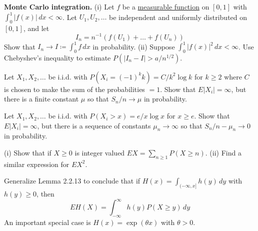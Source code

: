   \begin{exercise}[Durrett 2.2.3]
    \textbf{Monte Carlo integration.} (i) Let $f$ be a \hyperref[mt-def:measurable-function]{measurable function} on $[0, 1]$ with $\int_0^1 |f(x)| \, dx < \infty$. Let $U_1, U_2, \dots$ be independent and uniformly distributed on $[0, 1]$, and let
    \begin{equation*}
      I_n = n^{-1}(f(U_1) + \dots + f(U_n))
    \end{equation*}
    Show that $I_n \to I \coloneqq \int_0^1 f \, dx$ in probability. (ii) Suppose $\int_0^1 |f(x)|^2 \, dx < \infty$. Use Chebyshev's inequality to estimate $P(|I_n - I| > a/n^{1/2})$.
  \end{exercise}
  \begin{solution}

  \end{solution}

  \begin{exercise}[Durrett 2.2.4]
    Let $X_1, X_2, \dots$ be i.i.d. with $P(X_i = (-1)^k k) = C/k^2 \log k$ for $k \geq 2$ where $C$ is chosen to make the sum of the probabilities $= 1$. Show that $E|X_i| = \infty$, but there is a finite constant $\mu$ so that $S_n/n \to \mu$ in probability.
  \end{exercise}
  \begin{solution}

  \end{solution}

  \begin{exercise}[Durrett 2.2.5]
    Let $X_1, X_2, \dots$ be i.i.d. with $P(X_i > x) = e/x \log x$ for $x \geq e$. Show that $E|X_i| = \infty$, but there is a sequence of constants $\mu_n \to \infty$ so that $S_n/n - \mu_n \to 0$ in probability.
  \end{exercise}
  \begin{solution}

  \end{solution}

  \begin{exercise}[Durrett 2.2.6]
    (i) Show that if $X \geq 0$ is integer valued $EX = \sum_{n \geq 1} P(X \geq n)$. (ii) Find a similar expression for $EX^2$.
  \end{exercise}
  \begin{solution}

  \end{solution}

  \begin{exercise}[Durrett 2.2.7]
    Generalize Lemma 2.2.13 to conclude that if $H(x) = \int_{(-\infty, x]} h(y) \, dy$ with $h(y) \geq 0$, then
    \begin{equation*}
      E H(X) = \int_{-\infty}^{\infty} h(y) P(X \geq y) \, dy
    \end{equation*}
    An important special case is $H(x) = \exp(\theta x)$ with $\theta > 0$.
  \end{exercise}
  \begin{solution}

  \end{solution}

